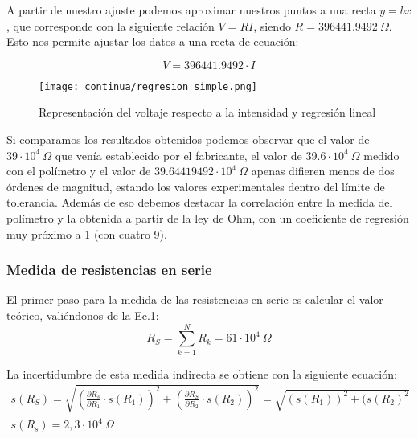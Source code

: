 \documentclass[a4paper,12pt,titlepage]{article}
\begin{document}
A partir de nuestro ajuste podemos aproximar nuestros puntos a una recta $y=bx$, que corresponde con la siguiente relación $V=RI$, siendo \newline $R=396441.9492\: \Omega$. Esto nos permite ajustar los datos a una recta de ecuación:

\begin{equation}
    V = 396441.9492 \cdot I
\end{equation}

\begin{figure}[ht]
    \centering
    \texttt{[image: continua/regresion simple.png]}
    \caption{Representación del voltaje respecto a la intensidad y regresión lineal}
    \label{Regresión simple}
\end{figure}

Si comparamos los resultados obtenidos podemos observar que el valor de $39\cdot 10^4\: \Omega$ que venía establecido por el fabricante, el valor de $39.6\cdot 10^4\: \Omega$ medido con el polímetro y el valor de $39.64419492 \cdot 10^4\: \Omega$ apenas difieren menos de dos órdenes de magnitud, estando los valores experimentales dentro del límite de tolerancia. Además de eso debemos destacar la correlación entre la medida del polímetro y la obtenida a partir de la ley de Ohm, con un coeficiente de regresión muy próximo a 1 (con cuatro 9).

\newpage

\subsubsection{Medida de resistencias en serie}

El primer paso para la medida de las resistencias en serie es calcular el valor teórico, valiéndonos de la Ec.1:
    \begin{equation}    %
        R_{S}=\sum_{k=1}^NR_{k}=61 \cdot 10^4 \: \Omega
    \end{equation}

La incertidumbre de esta medida indirecta se obtiene con la siguiente ecuación:
\begin{equation}
    \begin{gathered}    %
    s(R_{S})= \sqrt{\left (\frac{\partial R_{s}}{\partial R_{1}} \cdot s(R_{1})\right )^2+\left (\frac{\partial R_{S}}{\partial R_{2}} \cdot s(R_{2}) \right )^2}=\sqrt{(s(R_{1}))^2+(s(R_{2})^2}
    \\ s(R_{s})=2,3 \cdot 10^4 \: \Omega
    \end{gathered}
\end{equation}
\end{document}
